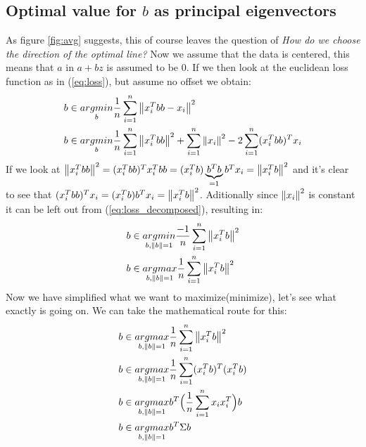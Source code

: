 			\subsection{Optimal value for $b$ as principal eigenvectors}
			As figure \ref{fig:avg} suggests, this of course leaves the question of \textit{How do we choose the direction of the optimal line?} Now we assume that the data is centered, this means that $a$ in $a+bz$ is assumed to be $0$. If we then look at the euclidean loss function as in (\ref{eq:loss}), but assume no offset we obtain:
			\begin{equation}
				\begin{split}
					b&\in\underset{b}{argmin}\frac{1}{n}\sum_{i=1}^{n}\left\lVert x_i^Tbb - x_i\right\rVert^2 \\
					b&\in\underset{b}{argmin}\frac{1}{n}\sum_{i=1}^{n}\left\lVert x_i^Tbb\right\rVert^2 +\sum_{i=1}^{n} \left\lVert x_i\right\rVert^2 - 2\sum_{i=1}^{n} (x_i^Tbb)^Tx_i \\
				\end{split}		
				\label{eq:loss_decomposed}		
			\end{equation}
			If we look at $\left\lVert x_i^Tbb\right\rVert^2 = (x_i^Tbb)^Tx_i^Tbb = (x_i^Tb)\underbrace{b^Tb}_{=1}b^Tx_i = \left\lVert x_i^Tb\right\rVert^2$ and it's clear to see that $(x_i^Tbb)^Tx_i = (x_i^Tb)b^Tx_i = \left\lVert x_i^Tb\right\rVert^2$. Aditionally since $\left\lVert x_i\right\rVert^2$ is constant it can be left out from (\ref{eq:loss_decomposed}), resulting in:
			\begin{equation}
				\begin{split}
					b&\in\underset{b,\left\lVert b\right\rVert=1}{argmin}\frac{-1}{n}\sum_{i=1}^{n} \left\lVert x_i^Tb\right\rVert^2 \\
					b&\in\underset{b,\left\lVert b\right\rVert=1}{argmax}\frac{1}{n}\sum_{i=1}^{n} \left\lVert x_i^Tb\right\rVert^2 \\
				\end{split}			
			\end{equation}
			Now we have simplified what we want to maximize(minimize), let's see what exactly is going on. We can take the mathematical route for this:
			\begin{equation}
			\label{eq:sample_var}
				\begin{split}
					b&\in\underset{b,\left\lVert b\right\rVert=1}{argmax}\frac{1}{n}\sum_{i=1}^{n} \left\lVert x_i^Tb\right\rVert^2 \\
					b&\in\underset{b,\left\lVert b\right\rVert=1}{argmax}\frac{1}{n}\sum_{i=1}^{n} (x_i^Tb)^T(x_i^Tb) \\
					b&\in\underset{b,\left\lVert b\right\rVert=1}{argmax } b^T\Big(\frac{1}{n}\sum_{i=1}^{n} x_ix_i^T\Big)b \\					
					b&\in\underset{b,\left\lVert b\right\rVert=1}{argmax } b^T \Sigma b \\
				\end{split}			
			\end{equation}
